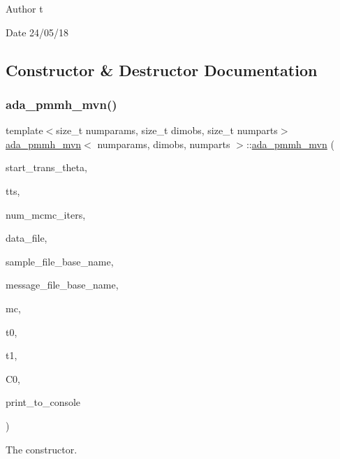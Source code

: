 \begin{DoxyAuthor}{Author}
t 
\end{DoxyAuthor}
\begin{DoxyDate}{Date}
24/05/18 
\end{DoxyDate}


\subsection{Constructor \& Destructor Documentation}
\mbox{\label{classada__pmmh__mvn_ae3155f8b2994845d7f637279b04ce176}} 
\subsubsection{\texorpdfstring{ada\+\_\+pmmh\+\_\+mvn()}{ada\_pmmh\_mvn()}}
{\footnotesize\ttfamily template$<$size\+\_\+t numparams, size\+\_\+t dimobs, size\+\_\+t numparts$>$ \\
\hyperlink{classada__pmmh__mvn}{ada\+\_\+pmmh\+\_\+mvn}$<$ numparams, dimobs, numparts $>$\+::\hyperlink{classada__pmmh__mvn}{ada\+\_\+pmmh\+\_\+mvn} (\begin{DoxyParamCaption}\item[{const psv \&}]{start\+\_\+trans\+\_\+theta,  }\item[{const std\+::vector$<$ Trans\+Type $>$ \&}]{tts,  }\item[{const unsigned int \&}]{num\+\_\+mcmc\+\_\+iters,  }\item[{const std\+::string \&}]{data\+\_\+file,  }\item[{const std\+::string \&}]{sample\+\_\+file\+\_\+base\+\_\+name,  }\item[{const std\+::string \&}]{message\+\_\+file\+\_\+base\+\_\+name,  }\item[{const bool \&}]{mc,  }\item[{const unsigned int \&}]{t0,  }\item[{const unsigned int \&}]{t1,  }\item[{const psm \&}]{C0,  }\item[{bool}]{print\+\_\+to\+\_\+console }\end{DoxyParamCaption})}



The constructor. 


